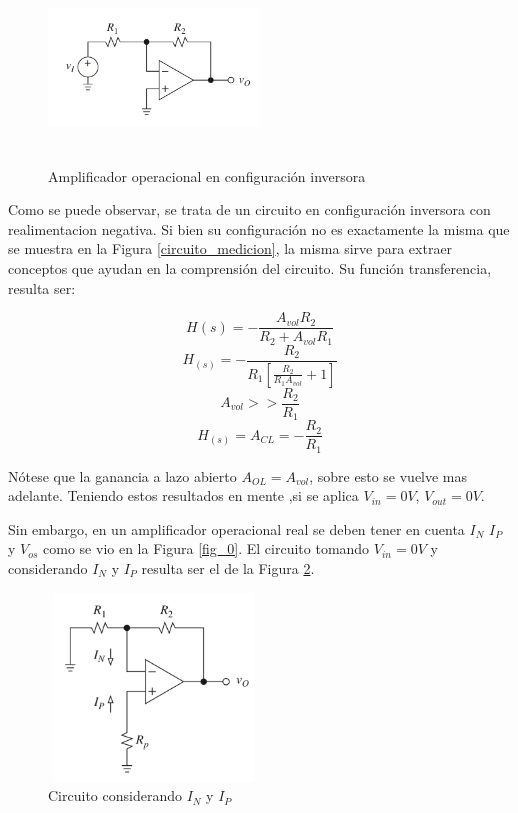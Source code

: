 \begin{figure}[ht]                                                       
    \centering\includegraphics[width=0.5\textwidth, height=5cm]{../Ex3/Figuras/fig_1.png}
     \caption{Amplificador operacional en configuración inversora}
     \label{inverter}
     \end{figure}

Como se puede observar, se trata de un circuito en configuración inversora con realimentacion negativa. Si bien su configuración no es exactamente la misma que se muestra en la Figura \ref{circuito_medicion}, la misma sirve para extraer conceptos que ayudan en la comprensión del circuito.
Su función transferencia, resulta ser:

\begin{displaymath} H(s) = -\frac{A_{vol} R_2}{R_2 + A_{vol} R_1} \end{displaymath}
\begin{displaymath} H_(s) = - \frac{R_2}{R_1 [\frac{R_2}{R_1 A_{vol}}+1]} \end{displaymath}
\begin{displaymath} A_{vol} >> \frac{R_2}{R_1} \end{displaymath}  
\begin{equation}  H_(s) = A_{CL} = - \frac{R_2}{R_1} \label{ganancia_OA_2}\end{equation}

Nótese que la ganancia a lazo abierto $A_{OL} = A_{vol}$, sobre esto se vuelve mas adelante.
Teniendo estos resultados en mente ,si se aplica $V_{in} = 0V$, $V_{out} = 0V$.

Sin embargo, en un amplificador operacional real se deben tener en cuenta $I_N$ $I_P$ y $V_{os}$ como se vio en la Figura \ref{fig_0}. El circuito tomando $V_{in} = 0V$ y considerando $I_N$ y $I_P$ resulta ser el de la 
Figura \ref{fig_2}.

\begin{figure}[ht]                                                       
    \centering\includegraphics[width=0.5\textwidth, height=5cm]{../Ex3/Figuras/fig_2.png}
     \caption{Circuito considerando $I_N$ y $I_P$}
     \label{fig_2}
     \end{figure}

